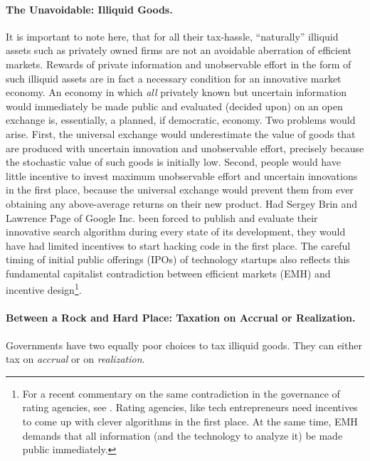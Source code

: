 \paragraph{The Unavoidable: Illiquid Goods.} It is important to note here, that for all their tax-hassle, ``naturally'' illiquid assets such as privately owned firms are not an avoidable aberration of efficient markets. Rewards of private information and unobservable effort in the form of such illiquid assets are in fact a necessary condition for an innovative market economy. An economy in which \emph{all} privately known but uncertain information would immediately be made public and evaluated (decided upon) on an open exchange is, essentially, a planned, if democratic, economy.
 Two problems would arise. First, the universal exchange would underestimate the value of goods that are produced with uncertain innovation and unobservable effort, precisely because the stochastic value of such goods is initially low. Second, people would have little incentive to invest maximum unobservable effort and uncertain innovations in the first place, because the universal exchange would prevent them from ever obtaining any above-average returns on their new product. Had Sergey Brin and Lawrence Page of Google Inc. been forced to publish and evaluate their innovative search algorithm during every state of its development, they would have had limited incentives to start hacking code in the first place. The careful timing of initial public offerings (IPOs) of technology startups also reflects this fundamental capitalist contradiction between efficient markets (EMH) and incentive design\footnote{
	For a recent commentary on the same contradiction in the governance of rating agencies, see \citealt{TheEconomist2009}. Rating agencies, like tech entrepreneurs need incentives to come up with clever algorithms in the first place. At the same time, EMH demands that all information (and the technology to analyze it) be made public immediately.}.

\paragraph{Between a Rock and Hard Place: Taxation on Accrual or Realization.} Governments have two equally poor choices to tax illiquid goods. They can either tax on \emph{accrual} or on \emph{realization}.

